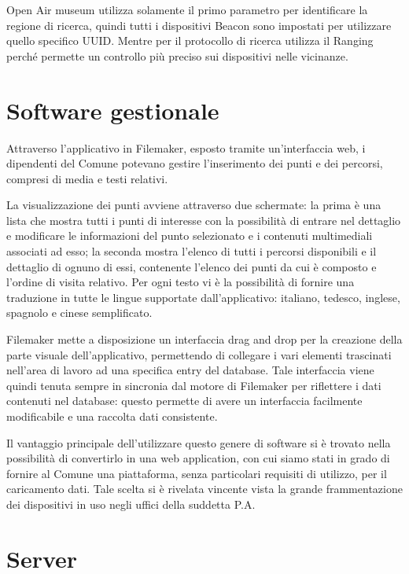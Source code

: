 Open Air museum utilizza solamente il primo parametro per identificare la regione di ricerca, quindi tutti i dispositivi Beacon sono impostati per utilizzare quello specifico UUID. Mentre per il protocollo di ricerca utilizza il Ranging perché permette un controllo più preciso sui dispositivi nelle vicinanze.

\section{Software gestionale}\vspace{5mm}

	Attraverso l’applicativo in Filemaker, esposto tramite un’interfaccia web, i dipendenti del Comune potevano gestire l’inserimento dei punti e dei percorsi, compresi di media e testi relativi. \vspace{5mm}
	
La visualizzazione dei punti avviene attraverso due schermate: la prima è una lista che mostra tutti i punti di interesse con la possibilità di entrare nel dettaglio e modificare le informazioni del punto selezionato e i contenuti multimediali associati ad esso; la seconda mostra l'elenco di tutti i percorsi disponibili e il dettaglio di ognuno di essi, contenente l'elenco dei punti da cui è composto e l'ordine di visita relativo. Per ogni testo vi è la possibilità di fornire una traduzione in tutte le lingue supportate dall'applicativo: italiano, tedesco, inglese, spagnolo e cinese semplificato.\vspace{5mm}

Filemaker mette a disposizione un interfaccia drag and drop per la creazione della parte visuale dell'applicativo, permettendo di collegare i vari elementi trascinati nell'area di lavoro ad una specifica entry del database. Tale interfaccia viene quindi tenuta sempre in sincronia dal motore di Filemaker per riflettere i dati contenuti nel database: questo permette di avere un interfaccia facilmente modificabile e una raccolta dati consistente.\vspace{5mm}

Il vantaggio principale dell'utilizzare questo genere di software si è trovato nella possibilità di convertirlo in una web application, con cui siamo stati in grado di fornire al Comune una piattaforma, senza particolari requisiti di utilizzo, per il caricamento dati. Tale scelta si è rivelata vincente vista la grande frammentazione dei dispositivi in uso negli uffici della suddetta P.A.

\section{Server}\vspace{5mm}
	
